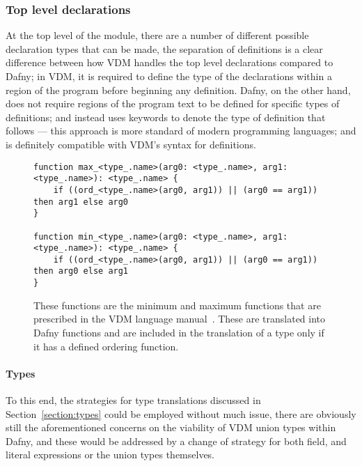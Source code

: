 \documentclass{entcs}
\begin{document}
\subsubsection{Top level declarations}\label{section:translating_declarations}

At the top level of the module, there are a number of different possible declaration types that can be made, the separation of definitions is a clear difference between how VDM handles the top level declarations compared to Dafny; in VDM, it is required to define the type of the declarations within a region of the program before beginning any definition. Dafny, on the other hand, does not require regions of the program text to be defined for specific types of definitions; and instead uses keywords to denote the type of definition that follows --- this approach is more standard of modern programming languages; and is definitely compatible with VDM's syntax for definitions.

\begin{figure}[h]
	\begin{center}
        \begin{lstlisting}[language=Dafny]
function max_<type_.name>(arg0: <type_.name>, arg1: <type_.name>): <type_.name> {
    if ((ord_<type_.name>(arg0, arg1)) || (arg0 == arg1)) then arg1 else arg0
}

function min_<type_.name>(arg0: <type_.name>, arg1: <type_.name>): <type_.name> {
    if ((ord_<type_.name>(arg0, arg1)) || (arg0 == arg1)) then arg0 else arg1
}
        \end{lstlisting}
		\caption{These functions are the minimum and maximum functions that are prescribed in the VDM language manual~\cite{VDMMiniMaxExcerpt}. These are translated into Dafny functions and are included in the translation of a type only if it has a defined ordering function.}\label{fig:dafny_max_and_min}
	\end{center}
\end{figure}

\paragraph{Types} 

To this end, the strategies for type translations discussed in Section~\ref{section:types} could be employed without much issue, there are obviously still the aforementioned concerns on the viability of VDM union types within Dafny, and these would be addressed by a change of strategy for both field, and literal expressions or the union types themselves. 
\end{document}
